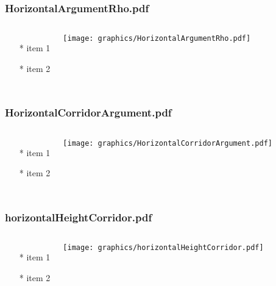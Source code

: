 \documentclass{beamer}
\begin{document}
\begin{frame} \frametitle{HorizontalArgumentRho.pdf}
    \begin{columns}[c]
        \begin{itemize}
            \item[*] item 1
            \item[*] item 2
        \end{itemize}
        \begin{minipage}{\linewidth}
            \begin{center}
            \texttt{[image: graphics/HorizontalArgumentRho.pdf]}
            \label{gfx:HorizontalArgumentRho.pdf}
            \end{center}
        \end{minipage}
    \end{columns}
\end{frame}
\begin{frame} \frametitle{HorizontalCorridorArgument.pdf}
    \begin{columns}[c]
        \begin{itemize}
            \item[*] item 1
            \item[*] item 2
        \end{itemize}
        \begin{minipage}{\linewidth}
            \begin{center}
            \texttt{[image: graphics/HorizontalCorridorArgument.pdf]}
            \label{gfx:HorizontalCorridorArgument.pdf}
            \end{center}
        \end{minipage}
    \end{columns}
\end{frame}
\begin{frame} \frametitle{horizontalHeightCorridor.pdf}
    \begin{columns}[c]
        \begin{itemize}
            \item[*] item 1
            \item[*] item 2
        \end{itemize}
        \begin{minipage}{\linewidth}
            \begin{center}
            \texttt{[image: graphics/horizontalHeightCorridor.pdf]}
            \label{gfx:horizontalHeightCorridor.pdf}
            \end{center}
        \end{minipage}
    \end{columns}
\end{frame}
\end{document}
